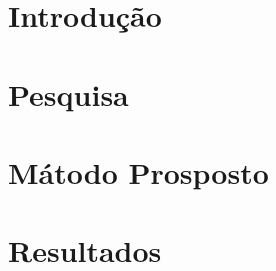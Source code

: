 \setlength{\absparsep}{18pt} %
%





\textual

\chapter[Introdução]{Introdução}\label{Cap:Introducao}


\chapter[Pesquisa Bibliográfica]{Pesquisa}\label{Cap:FisLHC}


\chapter[MétodoProposto]{Mátodo Prosposto}\label{Cap:Método}


\chapter[Resultados]{Resultados}\label{Cap:results}


